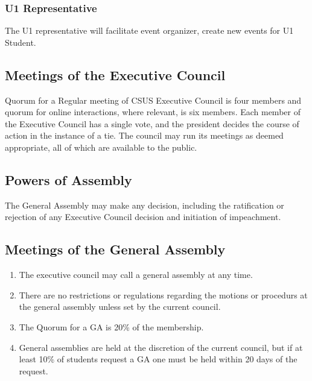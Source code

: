 \subsubsection{U1 Representative}\label{u1-representative}

The U1 representative will facilitate event organizer, create new events
for U1 Student.

\subsection{Meetings of the Executive
Council}\label{meetings-of-the-executive-council}

Quorum for a Regular meeting of CSUS Executive Council is four members
and quorum for online interactions, where relevant, is six members. Each
member of the Executive Council has a single vote, and the president
decides the course of action in the instance of a tie. The council may
run its meetings as deemed appropriate, all of which are available to
the public.

\subsection{Powers of Assembly}\label{powers-of-assembly}

The General Assembly may make any decision, including the ratification
or rejection of any Executive Council decision and initiation of
impeachment.

\subsection{Meetings of the General
Assembly}\label{meetings-of-the-general-assembly}

\begin{enumerate}
\def\labelenumi{\arabic{enumi}.}
\item
  The executive council may call a general assembly at any time.
\item
  There are no restrictions or regulations regarding the motions or
  procedurs at the general assembly unless set by the current council.
\item
  The Quorum for a GA is 20\% of the membership.
\item
  General assemblies are held at the discretion of the current council,
  but if at least 10\% of students request a GA one must be held within
  20 days of the request.
\end{enumerate}

